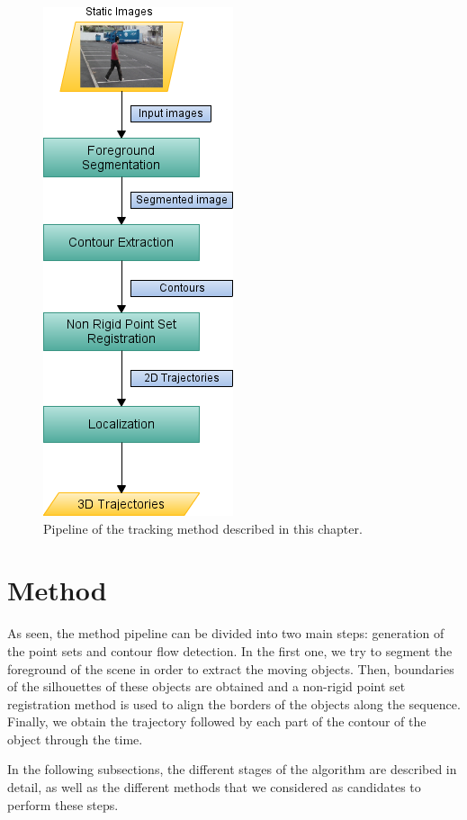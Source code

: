 \begin{figure}[h!]
  \centering
  \includegraphics{pipeline}
  \caption{Pipeline of the tracking method described in this chapter.}\label{fig:cp02_pipeline}
\end{figure}

\section{Method}\label{ch:chapter02_01}

As seen, the method pipeline can be divided into two main steps: generation of the point sets and contour flow detection. In the first one, we try to segment the foreground of the scene in order to extract the moving objects. Then, boundaries of the silhouettes of these objects are obtained and a non-rigid point set registration method is used to align the borders of the objects along the sequence. Finally, we obtain the trajectory followed by each part of the contour of the object through the time.

In the following subsections, the different stages of the algorithm are described in detail, as well as the different methods that we considered as candidates to perform these steps.

